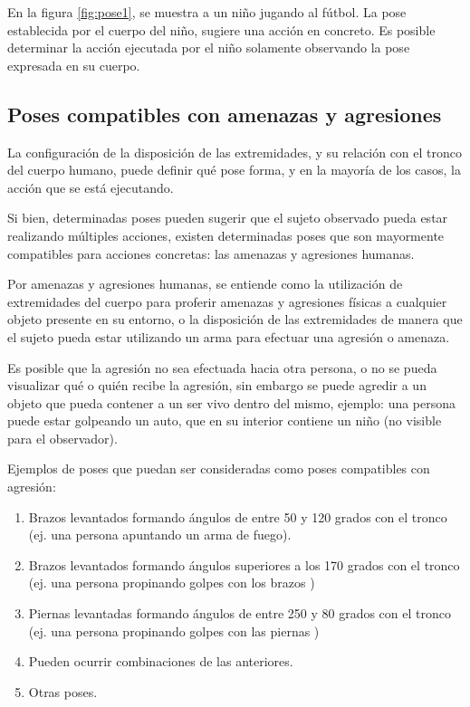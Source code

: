 \documentclass[a4paper,12pt,oneside,spanish]{book}
\begin{document}
En la figura \ref{fig:pose1}, se muestra a un niño jugando al fútbol. La pose establecida por el cuerpo del niño, sugiere una acción en concreto. Es posible determinar la acción ejecutada por el niño solamente observando la pose expresada en su cuerpo. \par

\subsection{Poses compatibles con amenazas y agresiones}

La configuración de la disposición de las extremidades, y su relación con el tronco del cuerpo humano, puede definir qué pose forma, y en la mayoría de los casos, la acción que se está ejecutando. \par

Si bien, determinadas poses pueden sugerir que el sujeto observado pueda estar realizando múltiples acciones, existen determinadas poses que son mayormente compatibles para acciones concretas: las amenazas y agresiones humanas.\par

Por amenazas y agresiones humanas, se entiende como la utilización de extremidades del cuerpo para proferir amenazas y agresiones físicas a cualquier objeto presente en su entorno, o la disposición de las extremidades de manera que el sujeto pueda estar utilizando un arma para efectuar una agresión o amenaza. \par 

Es posible que la agresión no sea efectuada hacia otra persona, o no se pueda visualizar qué o quién recibe la agresión, sin embargo se puede agredir a un objeto que pueda contener a un ser vivo dentro del mismo, ejemplo: una persona puede estar golpeando un auto, que en su interior contiene un niño (no visible para el observador).\par

Ejemplos de poses que puedan ser consideradas como poses compatibles con agresión:

\begin{enumerate}
	\baselineskip 16pt
	\item Brazos levantados formando ángulos de entre 50 y 120 grados con el tronco (ej. una persona apuntando un arma de fuego). 
	\item Brazos levantados formando ángulos superiores a los 170 grados con el tronco (ej. una persona propinando golpes con los brazos ) 
	\item Piernas levantadas formando ángulos de entre 250 y 80 grados con el tronco  (ej. una persona propinando golpes con las piernas ) 
	\item Pueden ocurrir combinaciones de las anteriores.
	\item Otras poses.
\end{enumerate}	\baselineskip 16pt
\end{document}

